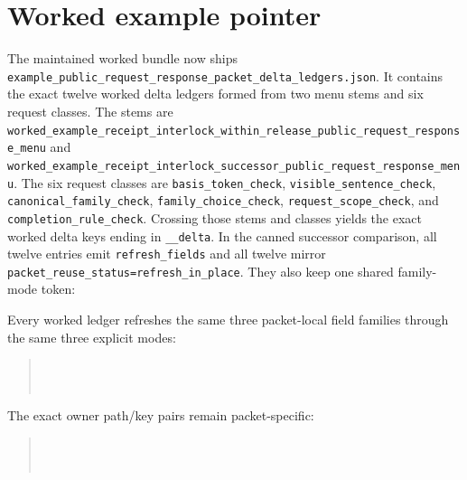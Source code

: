 \documentclass[11pt]{article}
\begin{document}
\section{Worked example pointer}
The maintained worked bundle now ships \nolinkurl{example_public_request_response_packet_delta_ledgers.json}.\cite{series:workedexample}
It contains the exact twelve worked delta ledgers formed from two menu stems and six request classes. The stems are \nolinkurl{worked_example_receipt_interlock_within_release_public_request_response_menu} and \nolinkurl{worked_example_receipt_interlock_successor_public_request_response_menu}. The six request classes are \texttt{basis\_token\_check}, \texttt{visible\_sentence\_check}, \texttt{canonical\_family\_check}, \texttt{family\_choice\_check}, \texttt{request\_scope\_check}, and \texttt{completion\_rule\_check}. Crossing those stems and classes yields the exact worked delta keys ending in \texttt{\_\_delta}.
In the canned successor comparison, all twelve entries emit \texttt{refresh\_fields} and all twelve mirror \texttt{packet\_reuse\_status=refresh\_in\_place}. They also keep one shared family-mode token:
\begin{quote}\small
{}
\end{quote}
Every worked ledger refreshes the same three packet-local field families through the same three explicit modes:
\begin{quote}\small
{}\\
\\
\end{quote}
The exact owner path/key pairs remain packet-specific:
\begin{quote}\small
{}\\
\\
\end{quote}
\end{document}
